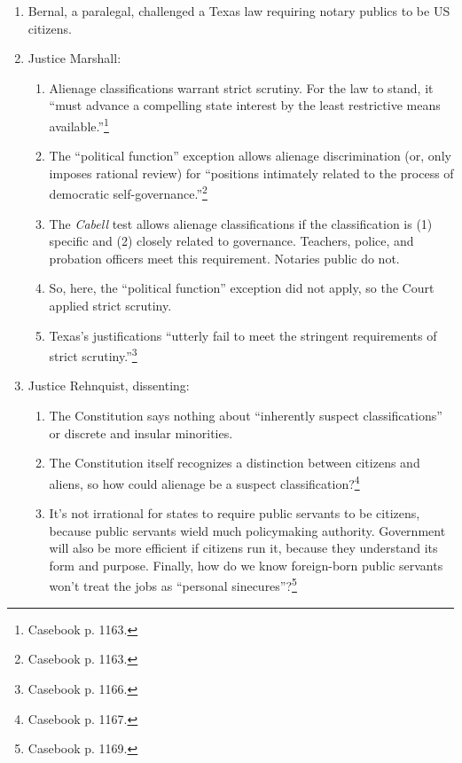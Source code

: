 \begin{enumerate}
    \item Bernal, a paralegal, challenged a Texas law requiring notary publics 
    to be US citizens.
    \item Justice Marshall:
    \begin{enumerate}
        \item Alienage classifications warrant strict scrutiny. For the law to 
        stand, it ``must advance a compelling state interest by the least 
        restrictive means available.''\footnote{Casebook p. 1163.}
        \item The ``political function'' exception allows alienage 
        discrimination (or, only imposes rational review) for ``positions 
        intimately related to the process of democratic 
        self-governance.''\footnote{Casebook p. 1163.}
        \item The \emph{Cabell} test allows alienage classifications if the 
        classification is (1) specific and (2) closely related to governance. 
        Teachers, police, and probation officers meet this requirement. 
        Notaries public do not.
        \item So, here, the ``political function'' exception did not apply, so 
        the Court applied strict scrutiny.
        \item Texas's justifications ``utterly fail to meet the stringent 
        requirements of strict scrutiny.''\footnote{Casebook p. 1166.}
    \end{enumerate}
    \item Justice Rehnquist, dissenting:
    \begin{enumerate}
        \item The Constitution says nothing about ``inherently suspect 
        classifications'' or discrete and insular minorities. 
        \item The Constitution itself recognizes a distinction between 
        citizens and aliens, so how could alienage be a suspect 
        classification?\footnote{Casebook p. 1167.}
        \item It's not irrational for states to require public servants to be 
        citizens, because public servants wield much policymaking authority. 
        Government will also be more efficient if citizens run it, because 
        they understand its form and purpose. Finally, how do we know 
        foreign-born public servants won't treat the jobs as ``personal 
        sinecures''?\footnote{Casebook p. 1169.}
    \end{enumerate}
\end{enumerate}

